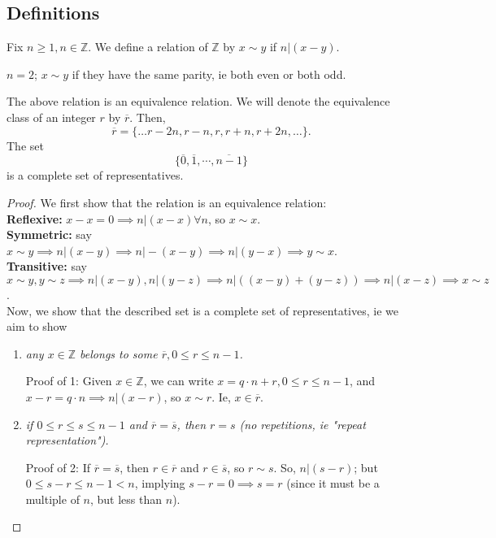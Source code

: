 \documentclass[12pt,oneside]{article}
\begin{document}
\subsection{Definitions}
\begin{definition}
  Fix $n \geq 1, n \in \mathbb{Z}$. We define a relation of $\mathbb{Z}$ by $x \sim y$ if $n | (x-y)$.
\end{definition}

\begin{example}
$n = 2$; $x \sim y$ if they have the same parity, ie both even or both odd.  
\end{example}

\begin{lemma}
  The above relation is an equivalence relation. We will denote the equivalence class of an integer $r$ by $\overline{r}$. Then, \[\overline{r} = \{\dots r - 2n, r - n, r , r+n, r + 2n, \dots\}.\]
  The set \[
  \{\overline{0}, \overline{1}, \cdots, \overline{n-1}\}  
  \]
is a complete set of representatives.
\end{lemma}

\begin{proof} We first show that the relation is an equivalence relation:\\
  \textbf{Reflexive: } $x - x = 0 \implies n | (x-x) \forall n$, so $x \sim x$.\\
  \textbf{Symmetric: } say $x \sim y \implies n | (x-y) \implies n | -(x-y) \implies n | (y - x) \implies y \sim x$.\\
  \textbf{Transitive: } say $x \sim y, y \sim z \implies n | (x-y), n |(y-z) \implies n | ((x-y) + (y-z)) \implies n | (x-z) \implies x \sim z$.\\
  Now, we show that the described set is a complete set of representatives, ie we aim to show \begin{enumerate}
    \item \textit{any $x \in \mathbb{Z}$ belongs to some $\overline{r}, 0 \leq r \leq n-1$.}


    Proof of 1: Given $x \in \mathbb{Z}$, we can write $x = q \cdot n + r, 0 \leq r \leq n - 1$, and $x - r = q \cdot n\implies n | (x-r)$, so $x \sim r$. Ie, $x \in \overline{r}$.
    \item \textit{if $0 \leq r \leq s \leq n - 1$ and $\overline{r} = \overline{s}$, then $r = s$ (no repetitions, ie "repeat representation").}
    

   Proof of 2: If $\overline{r} = \overline{s}$, then $r \in \overline{r}$ and $r \in \overline{s}$, so $r \sim s$. So, $n | (s-r)$; but $0 \leq s - r \leq n - 1 < n$, implying $s-r = 0 \implies s = r$ (since it must be a multiple of $n$, but less than $n$).
  \end{enumerate}
\end{proof}
\end{document}

